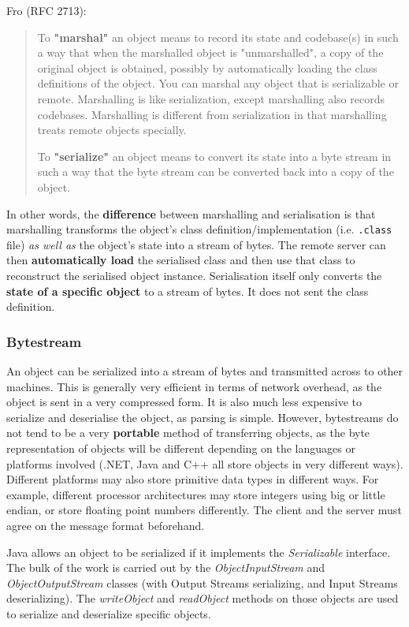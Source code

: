 \documentclass{article}
\begin{document}
Fro (RFC 2713):
\begin{quote}
To \textbf{"marshal"} an object means to record its state and codebase(s) in such a way that when the marshalled object is "unmarshalled", a copy of the original object is obtained, possibly by automatically loading the class definitions of the object. You can marshal any object that is serializable or remote. Marshalling is like serialization, except marshalling also records codebases. Marshalling is different from serialization in that marshalling treats remote objects specially. 

To \textbf{"serialize"} an object means to convert its state into a byte stream in such a way that the byte stream can be converted back into a copy of the object.
\end{quote}

In other words, the \textbf{difference} between marshalling and serialisation is that marshalling transforms the object's class definition/implementation (i.e.  \texttt{.class} file) \textit{as well as} the object's state into a stream of bytes. The remote server can then \textbf{automatically load} the serialised class and then use that class to reconstruct the serialised object instance. Serialisation itself only converts the \textbf{state of a specific object} to a stream of bytes. It does not sent the class definition.

\subsubsection{Bytestream}

An object can be serialized into a stream of bytes and transmitted across to other machines. This is generally very efficient in terms of network overhead, as the object is sent in a very compressed form. It is also much less expensive to serialize and deserialise the object, as parsing is simple. However, bytestreams do not tend to be a very \textbf{portable} method of transferring objects, as the byte representation of objects will be different depending on the languages or platforms involved (.NET, Java and C++ all store objects in very different ways). Different platforms may also store primitive data types in different ways. For example, different processor architectures may store integers using big or little endian, or store floating point numbers differently. The client and the server must agree on the message format beforehand.

Java allows an object to be serialized if it implements the \textit{Serializable} interface. The bulk of the work is carried out by the \textit{ObjectInputStream} and \textit{ObjectOutputStream} classes (with Output Streams serializing, and Input Streams deserializing). The \textit{writeObject} and \textit{readObject} methods on those objects are used to serialize and deserialize specific objects. 
\end{document}
